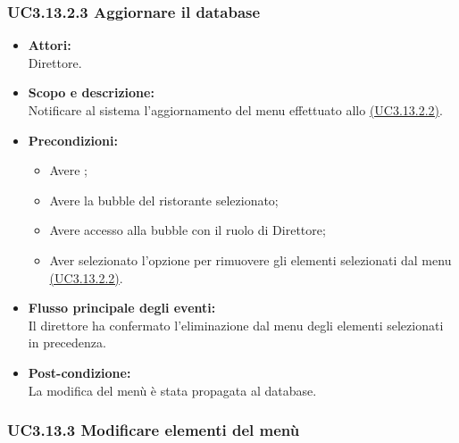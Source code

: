 \subsubsection{UC3.13.2.3 Aggiornare il database} \label{UC3.13.2.3}

\begin{itemize}
	\item \textbf{Attori:}
	\\Direttore.
	\item \textbf{Scopo e descrizione:} 
	\\Notificare al sistema l'aggiornamento del menu effettuato allo \hyperref[UC3.13.2.2]{(UC3.13.2.2)}.
	\item \textbf{Precondizioni:}
	\begin{itemize}
		\item Avere ;
		\item Avere la bubble del ristorante selezionato;
		\item Avere accesso alla bubble con il ruolo di Direttore;
		\item Aver selezionato l’opzione per rimuovere gli elementi selezionati dal menu \hyperref[UC3.13.2.2]{(UC3.13.2.2)}.
	\end{itemize}
	\item \textbf{Flusso principale degli eventi:}
	\\Il direttore ha confermato l’eliminazione dal menu degli elementi selezionati in precedenza.
	\item \textbf{Post-condizione:}
	\\La modifica del menù è stata propagata al database.
\end{itemize}

\subsubsection{UC3.13.3 Modificare elementi del menù} \label{UC3.13.3}

